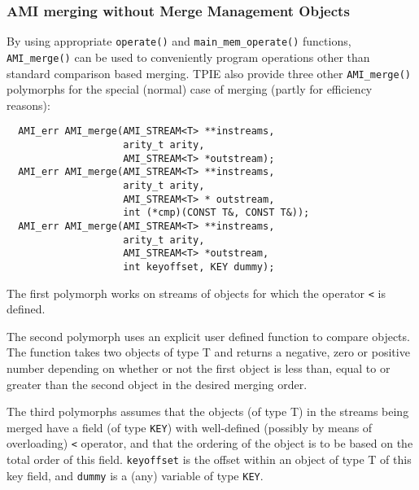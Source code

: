 


\subsubsection{AMI merging without Merge Management Objects}
\label{sec:ref-miami-merge}

By using appropriate \verb|operate()| and \verb|main_mem_operate()|
functions, \verb|AMI_merge()| can be used to conveniently program
operations other than standard comparison based merging. TPIE also provide
three other \verb|AMI_merge()| polymorphs for the special (normal) case of
merging (partly for efficiency reasons):

\begin{verbatim}
  AMI_err AMI_merge(AMI_STREAM<T> **instreams,
                    arity_t arity, 
                    AMI_STREAM<T> *outstream);
  AMI_err AMI_merge(AMI_STREAM<T> **instreams,
                    arity_t arity,
                    AMI_STREAM<T> * outstream,
                    int (*cmp)(CONST T&, CONST T&));
  AMI_err AMI_merge(AMI_STREAM<T> **instreams,
                    arity_t arity,
                    AMI_STREAM<T> *outstream,
                    int keyoffset, KEY dummy);
\end{verbatim}


The first polymorph works on streams of objects for which the operator
\verb|<| is defined.

The second polymorph uses an explicit user defined function to compare
objects. The function takes two objects of type T and returns a negative,
zero or positive number depending on whether or not the first object is
less than, equal to or greater than the second object in the desired
merging order.

The third polymorphs assumes that the objects (of type T) in the streams
being merged have a field (of type \verb|KEY|) with well-defined (possibly
by means of overloading) \verb|<| operator, and that the ordering of the
object is to be based on the total order of this field. \verb|keyoffset| is
the offset within an object of type T of this key field, and \verb|dummy| is
a (any) variable of type \verb|KEY|.

